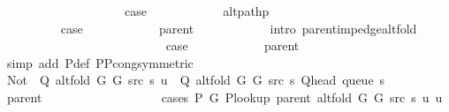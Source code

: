 \begin{isabellebody}
\ \ \ \ \ \ \ \ \isamarkupfalse%
\ {}\isanewline
\ \ \ \ \ \ \ \ \isamarkupfalse%
\ {\isacharquery}{\kern0pt}case\isanewline
\ \ \ \ \ \ \ \ \ \ \isamarkupfalse%
\ alt{\isacharunderscore}{\kern0pt}path{\isacharunderscore}{\kern0pt}p\isanewline
\ \ \ \ \ \ \ \ \ \ \isacommand{{\isachardot}{\kern0pt}}\isamarkupfalse%
\isanewline
\ \ \ \ \ \ \isamarkupfalse%
\isanewline
\ \ \ \ \ \ \ \ \isamarkupfalse%
\ {}\isanewline
\ \ \ \ \ \ \ \ \isamarkupfalse%
\ {\isacharquery}{\kern0pt}case\isanewline
\ \ \ \ \ \ \ \ \ \ \isamarkupfalse%
\ parent\isanewline
\ \ \ \ \ \ \ \ \ \ \isamarkupfalse%
\ {\isacharparenleft}{\kern0pt}intro\ parent{\isacharunderscore}{\kern0pt}imp{\isacharunderscore}{\kern0pt}edge{\isacharunderscore}{\kern0pt}alt{\isacharunderscore}{\kern0pt}fold{\isacharparenright}{\kern0pt}\isanewline
\ \ \ \ \ \ \isamarkupfalse%
\isanewline
\ \ \ \ \ \ \ \ \isamarkupfalse%
\ {}\isanewline
\ \ \ \ \ \ \ \ \isamarkupfalse%
\ {\isacharquery}{\kern0pt}case\isanewline
\ \ \ \ \ \ \ \ \ \ \isamarkupfalse%
\ parent\isanewline
\ \ \ \ \ \ \ \ \ \ \isamarkupfalse%
\ {\isacharparenleft}{\kern0pt}simp\ add{\isacharcolon}{\kern0pt}\ P{\isacharprime}{\kern0pt}{\isacharunderscore}{\kern0pt}def\ P{\isacharunderscore}{\kern0pt}P{\isacharprime}{\kern0pt}{\isacharprime}{\kern0pt}{\isacharunderscore}{\kern0pt}cong{\isacharbrackleft}{\kern0pt}symmetric{\isacharbrackright}{\kern0pt}{\isacharparenright}{\kern0pt}\isanewline
\ \ \ \ \ \ \isamarkupfalse%
\isanewline
\ \ \ \ \ \ \isamarkupfalse%
\ \isamarkupfalse%
\ {\isachardoublequoteopen}Not\ {\isasymcirc}\ Q\ {\isacharparenleft}{\kern0pt}alt{\isacharunderscore}{\kern0pt}fold\ G{}\ G{}\ src\ s{\isacharparenright}{\kern0pt}\ u\ {\isacharequal}{\kern0pt}\ Q\ {\isacharparenleft}{\kern0pt}alt{\isacharunderscore}{\kern0pt}fold\ G{}\ G{}\ src\ s{\isacharparenright}{\kern0pt}\ {\isacharparenleft}{\kern0pt}Q{\isacharunderscore}{\kern0pt}head\ {\isacharparenleft}{\kern0pt}queue\ s{\isacharparenright}{\kern0pt}{\isacharparenright}{\kern0pt}{\isachardoublequoteclose}\isanewline
\ \ \ \ \ \ \ \ \isamarkupfalse%
\ parent\isanewline
\ \ \ \ \ \ \ \ \isamarkupfalse%
\isanewline
\ \ \ \ \ \ \ \ \ \ {\isacharparenleft}{\kern0pt}cases\ {\isachardoublequoteopen}P{\isacharprime}{\kern0pt}\ G{}\ {\isacharparenleft}{\kern0pt}P{\isacharunderscore}{\kern0pt}lookup\ {\isacharparenleft}{\kern0pt}parent\ {\isacharparenleft}{\kern0pt}alt{\isacharunderscore}{\kern0pt}fold\ G{}\ G{}\ src\ s{\isacharparenright}{\kern0pt}{\isacharparenright}{\kern0pt}\ u{\isacharparenright}{\kern0pt}\ u{\isachardoublequoteclose}{\isacharparenright}{\kern0pt}\isanewline

\end{isabellebody}
